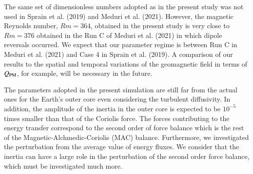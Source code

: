 {\color{red}
{\color{teal}
The same set of dimensionless numbers adopted as in the present study was not used in Sprain et al. (2019) and Meduri et al. (2021).
However, the magnetic Reynolds number, $Rm = 364$, obtained in the present study is very close to $Rm = 376$ obtained in the Run C of Meduri et al. (2021) in which dipole reversals occurred.
}
We expect that our parameter regime is between Run C in Meduri et al. (2021) and Case 4 in Sprain et al. (2019). 
}
{\color{teal}
A comparison of our results to the spatial and temporal variations of the geomagnetic field in terms of $Q_{\rm PM}$, for example, will be necessary in the future. 
}

{\color{blue}
{\color{teal}}
The parameters adopted in the present simulation are still far from the actual ones for the Earth's outer core even considering the turbulent diffusivity. 
In addition, the amplitude of the inertia in the outer core is expected to be $10^{-5}$ times smaller than that of the Coriolis force. 
The forces contributing to the energy transfer correspond to the second order of force balance which is the rest of the Magnetic-Alchmedic-Coriolis (MAC) balance. 
Furthermore, we investigated the perturbation from the average value of energy fluxes. 
{\color{teal}
We consider that the inertia can have a large role in the perturbation of the second order force balance, which must be investigated much more.
}
}

